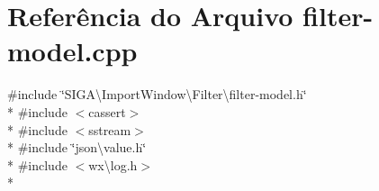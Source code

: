 \section{Referência do Arquivo filter-\/model.cpp}
\label{filter-model_8cpp}
{\ttfamily \#include \char`\"{}S\+I\+G\+A\textbackslash{}\+Import\+Window\textbackslash{}\+Filter\textbackslash{}filter-\/model.\+h\char`\"{}}\\*
{\ttfamily \#include $<$cassert$>$}\\*
{\ttfamily \#include $<$sstream$>$}\\*
{\ttfamily \#include \char`\"{}json\textbackslash{}value.\+h\char`\"{}}\\*
{\ttfamily \#include $<$wx\textbackslash{}log.\+h$>$}\\*
